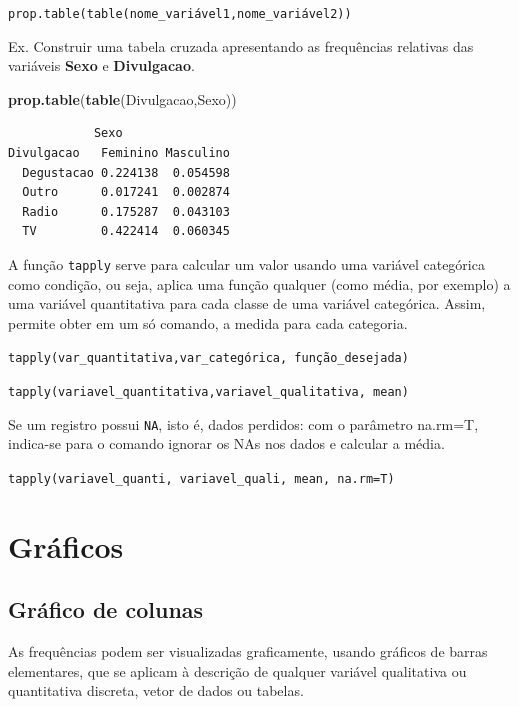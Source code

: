 \documentclass[12pt,brazil,oneside]{book}
\newenvironment{Shaded}{\begin{snugshade}}{\end{snugshade}}
\newcommand{\KeywordTok}[1]{\textcolor[rgb]{0.13,0.29,0.53}{\textbf{#1}}}
\newcommand{\NormalTok}[1]{#1}
\begin{document}
\texttt{prop.table(table(nome\_variável1,nome\_variável2))}

Ex. Construir uma tabela cruzada apresentando as frequências relativas das variáveis \textbf{Sexo} e \textbf{Divulgacao}.

\begin{Shaded}
\begin{Highlighting}[]
\KeywordTok{prop.table}\NormalTok{(}\KeywordTok{table}\NormalTok{(Divulgacao,Sexo))}
\end{Highlighting}
\end{Shaded}

\begin{verbatim}
            Sexo
Divulgacao   Feminino Masculino
  Degustacao 0.224138  0.054598
  Outro      0.017241  0.002874
  Radio      0.175287  0.043103
  TV         0.422414  0.060345
\end{verbatim}

A função \texttt{tapply} serve para calcular um valor usando uma variável categórica como condição, ou seja, aplica uma função qualquer (como média, por exemplo) a uma variável quantitativa para cada classe de uma variável categórica. Assim, permite obter em um só comando, a medida para cada categoria.

\texttt{tapply(var\_quantitativa,var\_categórica,\ função\_desejada)}

\texttt{tapply(variavel\_quantitativa,variavel\_qualitativa,\ mean)}

Se um registro possui \texttt{NA}, isto é, dados perdidos: com o parâmetro na.rm=T, indica-se para o comando ignorar os NAs nos dados e calcular a média.

\texttt{tapply(variavel\_quanti,\ variavel\_quali,\ mean,\ na.rm=T)}

\hypertarget{graficos}{%
\section{Gráficos}\label{graficos}}

\hypertarget{grafico-de-colunas}{%
\subsection{Gráfico de colunas}\label{grafico-de-colunas}}

As frequências podem ser visualizadas graficamente, usando gráficos de barras elementares, que se aplicam à descrição de qualquer variável qualitativa ou quantitativa discreta, vetor de dados ou tabelas.
\end{document}
